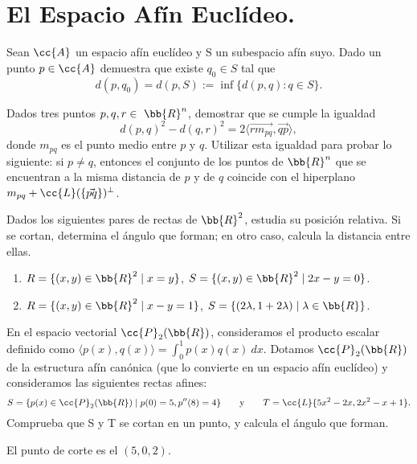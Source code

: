 \section{El Espacio Afín Euclídeo.}\label{Rel:Tema2}

\begin{ejercicio}
    Sean $\cc{A}$ un espacio afín euclídeo y S un subespacio afín suyo. Dado un punto $p \in \cc{A}$ demuestra que existe $q_0 \in S$ tal que
    \begin{equation*}
        d(p, q_0) = d(p, S) := \inf\{d(p, q) : q \in S\}.
    \end{equation*}
\end{ejercicio}

\begin{ejercicio} Dados tres puntos $p, q, r \in~\bb{R}^n$, demostrar que se cumple la igualdad
    \begin{equation*}
        d(p,q)^2 - d(q,r)^2 = 2\langle\vec{rm_{pq}}, \vec{qp}\rangle,
    \end{equation*}
    donde $m_{pq}$ es el punto medio entre $p$ y $q$. Utilizar esta igualdad para probar lo siguiente: si $p \neq q$, entonces el conjunto de los puntos de $\bb{R}^n$ que se encuentran a la misma distancia de $p$ y de $q$ coincide con el hiperplano $m_{pq} + \cc{L}(\{\vec{p q}\})^\perp$.
\end{ejercicio}

\begin{ejercicio}
    Dados los siguientes pares de rectas de $\bb{R}^2$, estudia su posición relativa. Si se cortan, determina el ángulo que forman; en otro caso, calcula la distancia entre ellas.
    \begin{enumerate}
        \item $R=\{(x,y)\in \bb{R}^2 \mid x=y\}$, $S=\{(x,y)\in \bb{R}^2\mid 2x-y=0\}$.
        \item $R=\{(x,y)\in \bb{R}^2 \mid x-y=1\}$, $S=\{(2\lambda,1+2\lambda) \mid \lambda\in \bb{R}\}$.
    \end{enumerate}
\end{ejercicio}

\begin{ejercicio}
    En el espacio vectorial $\cc{P}_2(\bb{R})$, consideramos el producto escalar definido como $\langle p(x), q(x)\rangle = \int_0^1 p(x)q(x)~dx$.
    Dotamos $\cc{P}_2(\bb{R})$ de la estructura afín canónica (que lo convierte en un espacio afín euclídeo) y consideramos las siguientes rectas afines:
    \begin{equation*}
        S = \{p(x) \in \cc{P}_2(\bb{R}) \mid p(0) = 5, p''(8) = 4\}
        \qquad \text{y} \qquad
        T = \cc{L}\{5x^2 - 2x, 2x^2 - x + 1\}.
    \end{equation*} 
    Comprueba que S y T se cortan en un punto, y calcula el ángulo que forman.

    El punto de corte es el $(5,0,2)$. 
\end{ejercicio}


